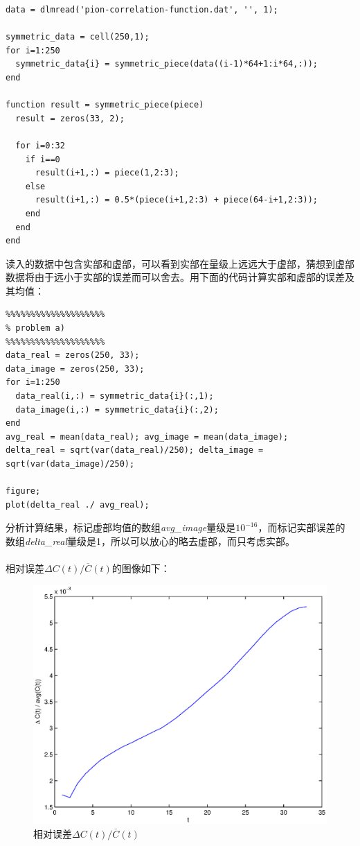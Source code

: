 \documentclass[paper=a4, fontsize=11pt]{scrartcl} %
\numberwithin{equation}{section} %
\numberwithin{figure}{section} %
\numberwithin{table}{section} %
\begin{document}
\begin{CJK*}{UTF8}{gbsn}
\lstset{language=MATLAB}
\begin{lstlisting}
data = dlmread('pion-correlation-function.dat', '', 1);

symmetric_data = cell(250,1);
for i=1:250
  symmetric_data{i} = symmetric_piece(data((i-1)*64+1:i*64,:));
end

function result = symmetric_piece(piece)
  result = zeros(33, 2);

  for i=0:32
    if i==0
      result(i+1,:) = piece(1,2:3);
    else
      result(i+1,:) = 0.5*(piece(i+1,2:3) + piece(64-i+1,2:3));
    end
  end
end
\end{lstlisting}
读入的数据中包含实部和虚部，可以看到实部在量级上远远大于虚部，猜想到虚部数据将由于远小于实部的误差而可以舍去。用下面的代码计算实部和虚部的误差及其均值：

\lstset{language=MATLAB}
\begin{lstlisting}
%%%%%%%%%%%%%%%%%%%%
% problem a)
%%%%%%%%%%%%%%%%%%%%
data_real = zeros(250, 33);
data_image = zeros(250, 33);
for i=1:250
  data_real(i,:) = symmetric_data{i}(:,1);
  data_image(i,:) = symmetric_data{i}(:,2);
end
avg_real = mean(data_real); avg_image = mean(data_image);
delta_real = sqrt(var(data_real)/250); delta_image = sqrt(var(data_image)/250);

figure;
plot(delta_real ./ avg_real);

\end{lstlisting}
分析计算结果，标记虚部均值的数组\textit{avg\_image}量级是$10^{-16}$，而标记实部误差的数组\textit{delta\_real}量级是1，所以可以放心的略去虚部，而只考虑实部。
\\\\
相对误差$\Delta C(t) / \overline{C}(t)$的图像如下：


\begin{figure}[H]
\centering
\includegraphics[width=140mm]{problem3_a_1.eps}
\caption{相对误差$\Delta C(t) / \overline{C}(t)$}
\end{figure}


\end{CJK*}
\end{document}
